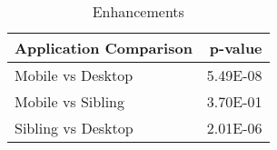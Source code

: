 \begin{table}[ht]
\centering
\caption{Enhancements} 
\begin{tabular}{lr}
  \hline
Application Comparison & p-value \\ 
  \hline
Mobile vs Desktop & 5.49E-08 \\ 
  Mobile vs Sibling & 3.70E-01 \\ 
  Sibling vs Desktop & 2.01E-06 \\ 
   \hline
\end{tabular}
\end{table}
